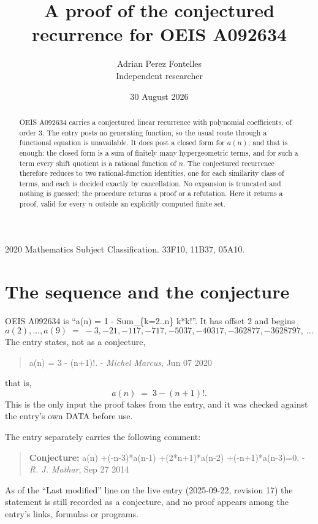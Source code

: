 \documentclass[11pt,a4paper]{article}
\title{A proof of the conjectured recurrence for OEIS A092634}
\author{Adrian Perez Fontelles\\ \small Independent researcher}
\date{30 August 2026}
\theoremstyle{plain}
\theoremstyle{definition}
\begin{document}
\maketitle

\begin{abstract}
OEIS A092634 carries a conjectured linear recurrence with polynomial coefficients, of
order 3. The entry posts no generating function, so the usual route through a
functional equation is unavailable. It does post a closed form for $a(n)$, and that is
enough: the closed form is a sum of finitely many hypergeometric terms, and for such a
term every shift quotient is a rational function of $n$. The conjectured recurrence
therefore reduces to two rational-function identities, one for each similarity
class of terms, and each is decided exactly by cancellation. No expansion is truncated and
nothing is guessed; the procedure returns a proof or a refutation. Here it returns a proof,
valid for every $n$ outside an explicitly computed finite set.
\end{abstract}

\noindent\small 2020 Mathematics Subject Classification. 33F10, 11B37, 05A10.\normalsize

\section{The sequence and the conjecture}

OEIS A092634 is ``a(n) = 1 - Sum\_\{k=2..n\} k*k!''. It has offset $2$ and begins
\[
a(2),\dots,a(9)\;=\;-3, -21, -117, -717, -5037, -40317, -362877, -3628797,\ \dots
\]
The entry states, not as a conjecture,
\begin{quote}\small
a(n) = 3 - (n+1)!. - \emph{Michel Marcus}, Jun 07 2020
\end{quote}
that is,
\begin{equation}\label{eq:cf}
a(n)\;=\;3 - \left(n + 1\right)! .
\end{equation}
This is the only input the proof takes from the entry, and it was checked against the
entry's own DATA before use.

The entry separately carries the following comment:
\begin{quote}\small
\textbf{Conjecture:} a(n) +(-n-3)*a(n-1) +(2*n+1)*a(n-2) +(-n+1)*a(n-3)=0. - \emph{R. J. Mathar}, Sep 27 2014
\end{quote}
As of the ``Last modified'' line on the live entry (2025-09-22, revision 17) the
statement is still recorded as a conjecture, and no proof appears among the entry's links,
formulas or programs.
\end{document}
